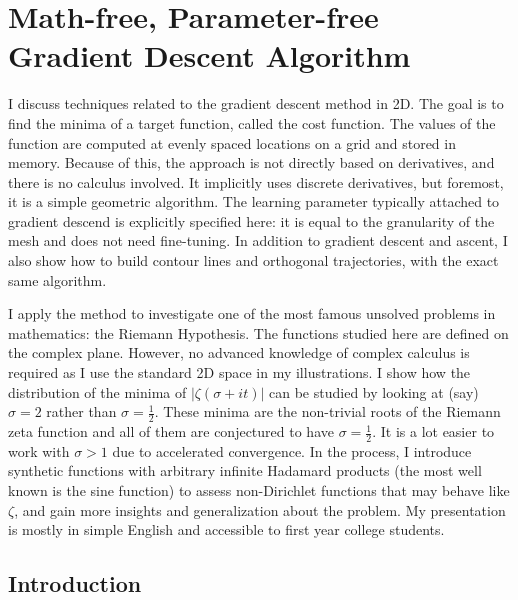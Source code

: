 \documentclass[oneside,10pt]{book}
\begin{document}
\chapter{Math-free, Parameter-free Gradient Descent Algorithm}{}\label{gentil}

I discuss techniques related to the gradient descent method in 2D.
The goal is to find the minima of a target function, called the cost function. The values of the function are computed at evenly spaced locations on a grid and stored in memory. Because of this, the approach is not directly based on derivatives, and there is no calculus involved. It implicitly uses discrete derivatives, but foremost, it is a simple geometric algorithm. The learning parameter typically
 attached to gradient descend is explicitly specified here: it is equal to the granularity of the mesh and does not need fine-tuning. In addition to gradient descent and ascent, I also show how to build contour lines and orthogonal trajectories, with the exact same algorithm.

I apply the method to investigate one of the most famous unsolved problems in mathematics: the Riemann Hypothesis. The functions studied here are defined on the complex plane. However, no advanced knowledge of complex calculus is required as I use the standard 2D space in my illustrations. I show how the distribution of the minima of $|\zeta(\sigma +it)|$ can be studied by looking at (say) $\sigma=2$ rather than $\sigma=\frac{1}{2}$. These minima are the non-trivial roots of the Riemann zeta function and all of them are conjectured to have $\sigma=\frac{1}{2}$. It is a lot easier to work with $\sigma>1$ due to
 accelerated convergence. In the process, I introduce synthetic functions with arbitrary infinite Hadamard products (the most well known is the sine function) to assess non-Dirichlet functions that may behave like $\zeta$, and gain more insights and generalization about the problem. My presentation is mostly in simple English and accessible to first year college students.

\section{Introduction}
\end{document}

